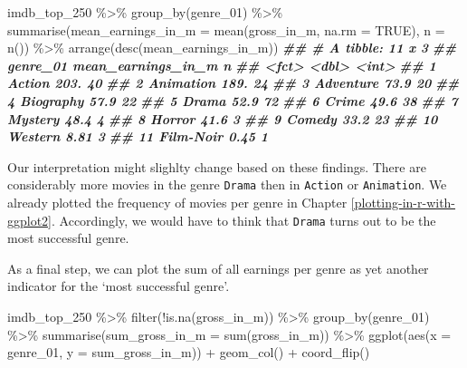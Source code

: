 \documentclass[
]{book}
\newenvironment{Shaded}{\begin{snugshade}}{\end{snugshade}}
\newcommand{\AttributeTok}[1]{\textcolor[rgb]{0.77,0.63,0.00}{#1}}
\newcommand{\ConstantTok}[1]{\textcolor[rgb]{0.00,0.00,0.00}{#1}}
\newcommand{\DocumentationTok}[1]{\textcolor[rgb]{0.56,0.35,0.01}{\textbf{\textit{#1}}}}
\newcommand{\FunctionTok}[1]{\textcolor[rgb]{0.00,0.00,0.00}{#1}}
\newcommand{\NormalTok}[1]{#1}
\newcommand{\SpecialCharTok}[1]{\textcolor[rgb]{0.00,0.00,0.00}{#1}}
\begin{document}
\begin{Shaded}
\begin{Highlighting}[]
\NormalTok{imdb\_top\_250 }\SpecialCharTok{\%\textgreater{}\%} 
  \FunctionTok{group\_by}\NormalTok{(genre\_01) }\SpecialCharTok{\%\textgreater{}\%}
  \FunctionTok{summarise}\NormalTok{(}\AttributeTok{mean\_earnings\_in\_m =} \FunctionTok{mean}\NormalTok{(gross\_in\_m, }\AttributeTok{na.rm =} \ConstantTok{TRUE}\NormalTok{),}
            \AttributeTok{n =} \FunctionTok{n}\NormalTok{()) }\SpecialCharTok{\%\textgreater{}\%} 
  \FunctionTok{arrange}\NormalTok{(}\FunctionTok{desc}\NormalTok{(mean\_earnings\_in\_m))}
\DocumentationTok{\#\# \# A tibble: 11 x 3}
\DocumentationTok{\#\#    genre\_01  mean\_earnings\_in\_m     n}
\DocumentationTok{\#\#    \textless{}fct\textgreater{}                  \textless{}dbl\textgreater{} \textless{}int\textgreater{}}
\DocumentationTok{\#\#  1 Action                203.      40}
\DocumentationTok{\#\#  2 Animation             189.      24}
\DocumentationTok{\#\#  3 Adventure              73.9     20}
\DocumentationTok{\#\#  4 Biography              57.9     22}
\DocumentationTok{\#\#  5 Drama                  52.9     72}
\DocumentationTok{\#\#  6 Crime                  49.6     38}
\DocumentationTok{\#\#  7 Mystery                48.4      4}
\DocumentationTok{\#\#  8 Horror                 41.6      3}
\DocumentationTok{\#\#  9 Comedy                 33.2     23}
\DocumentationTok{\#\# 10 Western                 8.81     3}
\DocumentationTok{\#\# 11 Film{-}Noir               0.45     1}
\end{Highlighting}
\end{Shaded}

Our interpretation might slighlty change based on these findings. There are considerably more movies in the genre \texttt{Drama} then in \texttt{Action} or \texttt{Animation}. We already plotted the frequency of movies per genre in Chapter \ref{plotting-in-r-with-ggplot2}. Accordingly, we would have to think that \texttt{Drama} turns out to be the most successful genre.

As a final step, we can plot the sum of all earnings per genre as yet another indicator for the `most successful genre'.

\begin{Shaded}
\begin{Highlighting}[]
\NormalTok{imdb\_top\_250 }\SpecialCharTok{\%\textgreater{}\%}
  \FunctionTok{filter}\NormalTok{(}\SpecialCharTok{!}\FunctionTok{is.na}\NormalTok{(gross\_in\_m)) }\SpecialCharTok{\%\textgreater{}\%} 
  \FunctionTok{group\_by}\NormalTok{(genre\_01) }\SpecialCharTok{\%\textgreater{}\%} 
  \FunctionTok{summarise}\NormalTok{(}\AttributeTok{sum\_gross\_in\_m =} \FunctionTok{sum}\NormalTok{(gross\_in\_m)) }\SpecialCharTok{\%\textgreater{}\%} 
  \FunctionTok{ggplot}\NormalTok{(}\FunctionTok{aes}\NormalTok{(}\AttributeTok{x =}\NormalTok{ genre\_01, }\AttributeTok{y =}\NormalTok{ sum\_gross\_in\_m)) }\SpecialCharTok{+}
  \FunctionTok{geom\_col}\NormalTok{() }\SpecialCharTok{+}
  \FunctionTok{coord\_flip}\NormalTok{()}
\end{Highlighting}
\end{Shaded}
\end{document}
